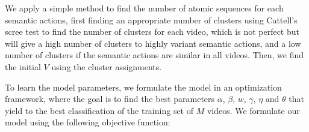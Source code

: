 \documentclass[10pt,letterpaper]{article}
\newcommand{\+}[1]{\ensuremath{{\boldsymbol #1}}}
\begin{document}
We apply a simple method to find the number of atomic sequences for each semantic actions, first finding an appropriate number of clusters using Cattell's scree test to find the number of clusters for each video, which is not perfect but will give a high number of clusters to highly variant semantic actions, and a low number of clusters if the semantic actions are similar in all videos. Then, we find the initial $V$ using the cluster assignments. 

\vspace{1em}
To learn the model parameters, we formulate the model in an optimization framework, where the goal is to find the best parameters $\alpha$, $\beta$, $w$, $\gamma$, $\eta$ and $\theta$ that yield to the best classification of the training set of $M$ videos.  We formulate our model using the following objective function:
\end{document}
